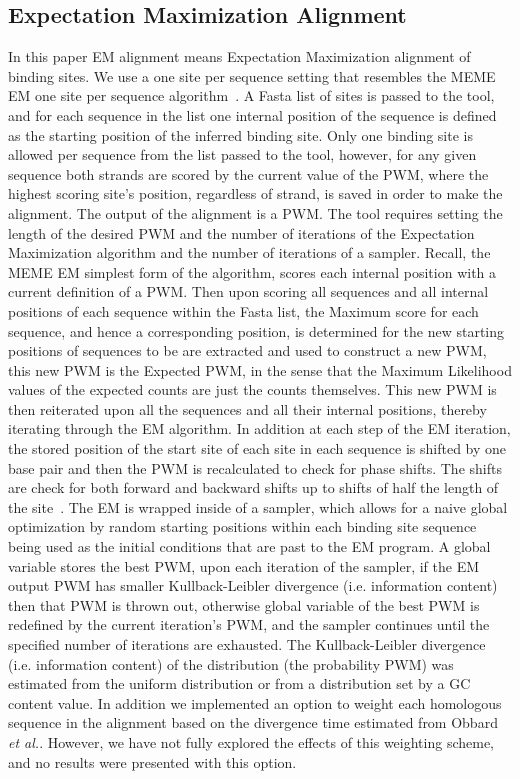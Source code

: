 \subsection{Expectation Maximization Alignment}\label{emalg}
	In this paper EM alignment means Expectation Maximization alignment of binding sites.  We use a one site per sequence setting that resembles the MEME~\cite{pmid7584439} EM one site per sequence algorithm~\cite{pmid7584402}.  A Fasta list of sites is passed to the tool, and for each sequence in the list one internal position of the sequence is defined as the starting position of the inferred binding site.  Only one binding site is allowed per sequence from the list passed to the tool, however, for any given sequence both strands are scored by the current value of the PWM, where the highest scoring site's position, regardless of strand, is saved in order to make the alignment.  The output of the alignment is a PWM.  The tool requires setting the length of the desired PWM and the number of iterations of the Expectation Maximization algorithm and the number of iterations of a sampler.  Recall, the MEME EM simplest form of the algorithm, scores each internal position with a current definition of a PWM.  Then upon scoring all sequences and all internal positions of each sequence within the Fasta list, the Maximum score for each sequence, and hence a corresponding position, is determined for the new starting positions of sequences to be are extracted and used to construct a new PWM, this new PWM is the Expected PWM, in the sense that the Maximum Likelihood values of the expected counts are just the counts themselves.  This new PWM is then reiterated upon all the sequences and all their internal positions, thereby iterating through the EM algorithm.  In addition at each step of the EM iteration, the stored position of the start site of each site in each sequence is shifted by one base pair and then the PWM is recalculated to check for phase shifts.  The shifts are check for both forward and backward shifts up to shifts of half the length of the site~\cite{lawrence1993detecting}.  The EM is wrapped inside of a sampler, which allows for a naive global optimization by random starting positions within each binding site sequence being used as the initial conditions that are past to the EM program.  A global variable stores the best PWM, upon each iteration of the sampler, if the EM output PWM has smaller Kullback-Leibler divergence (i.e. information content) then that PWM is thrown out, otherwise global variable of the best PWM is redefined by the current iteration's PWM, and the sampler continues until the specified number of iterations are exhausted.  The Kullback-Leibler divergence (i.e. information content) of the distribution (the probability PWM) was estimated from the uniform distribution or from a distribution set by a GC content value.
  In addition we implemented an option to weight each homologous sequence in the alignment based on the divergence time estimated from Obbard \textit{et al.}\cite{pmid22683811}.  However, we have not fully explored the effects of this weighting scheme, and no results were presented with this option. 


